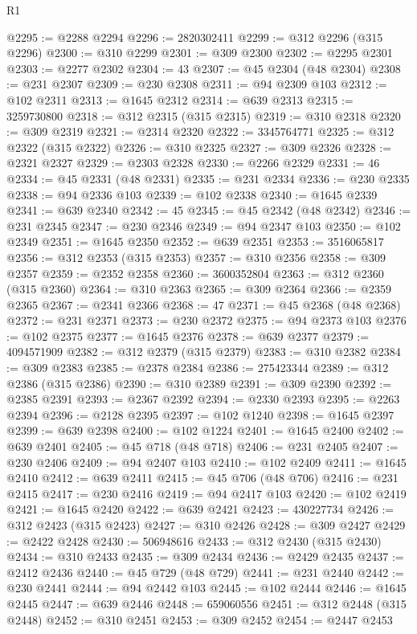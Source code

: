 \begin{lexlean}{R1}
\begin{coremodule}
@2295 := @2288 @2294
@2296 := 2820302411
@2299 := @312 @2296 (@315 @2296)
@2300 := @310 @2299
@2301 := @309 @2300
@2302 := @2295 @2301
@2303 := @2277 @2302
@2304 := 43
@2307 := @45 @2304 (@48 @2304)
@2308 := @231 @2307
@2309 := @230 @2308
@2311 := @94 @2309 @103
@2312 := @102 @2311
@2313 := @1645 @2312
@2314 := @639 @2313
@2315 := 3259730800
@2318 := @312 @2315 (@315 @2315)
@2319 := @310 @2318
@2320 := @309 @2319
@2321 := @2314 @2320
@2322 := 3345764771
@2325 := @312 @2322 (@315 @2322)
@2326 := @310 @2325
@2327 := @309 @2326
@2328 := @2321 @2327
@2329 := @2303 @2328
@2330 := @2266 @2329
@2331 := 46
@2334 := @45 @2331 (@48 @2331)
@2335 := @231 @2334
@2336 := @230 @2335
@2338 := @94 @2336 @103
@2339 := @102 @2338
@2340 := @1645 @2339
@2341 := @639 @2340
@2342 := 45
@2345 := @45 @2342 (@48 @2342)
@2346 := @231 @2345
@2347 := @230 @2346
@2349 := @94 @2347 @103
@2350 := @102 @2349
@2351 := @1645 @2350
@2352 := @639 @2351
@2353 := 3516065817
@2356 := @312 @2353 (@315 @2353)
@2357 := @310 @2356
@2358 := @309 @2357
@2359 := @2352 @2358
@2360 := 3600352804
@2363 := @312 @2360 (@315 @2360)
@2364 := @310 @2363
@2365 := @309 @2364
@2366 := @2359 @2365
@2367 := @2341 @2366
@2368 := 47
@2371 := @45 @2368 (@48 @2368)
@2372 := @231 @2371
@2373 := @230 @2372
@2375 := @94 @2373 @103
@2376 := @102 @2375
@2377 := @1645 @2376
@2378 := @639 @2377
@2379 := 4094571909
@2382 := @312 @2379 (@315 @2379)
@2383 := @310 @2382
@2384 := @309 @2383
@2385 := @2378 @2384
@2386 := 275423344
@2389 := @312 @2386 (@315 @2386)
@2390 := @310 @2389
@2391 := @309 @2390
@2392 := @2385 @2391
@2393 := @2367 @2392
@2394 := @2330 @2393
@2395 := @2263 @2394
@2396 := @2128 @2395
@2397 := @102 @1240
@2398 := @1645 @2397
@2399 := @639 @2398
@2400 := @102 @1224
@2401 := @1645 @2400
@2402 := @639 @2401
@2405 := @45 @718 (@48 @718)
@2406 := @231 @2405
@2407 := @230 @2406
@2409 := @94 @2407 @103
@2410 := @102 @2409
@2411 := @1645 @2410
@2412 := @639 @2411
@2415 := @45 @706 (@48 @706)
@2416 := @231 @2415
@2417 := @230 @2416
@2419 := @94 @2417 @103
@2420 := @102 @2419
@2421 := @1645 @2420
@2422 := @639 @2421
@2423 := 430227734
@2426 := @312 @2423 (@315 @2423)
@2427 := @310 @2426
@2428 := @309 @2427
@2429 := @2422 @2428
@2430 := 506948616
@2433 := @312 @2430 (@315 @2430)
@2434 := @310 @2433
@2435 := @309 @2434
@2436 := @2429 @2435
@2437 := @2412 @2436
@2440 := @45 @729 (@48 @729)
@2441 := @231 @2440
@2442 := @230 @2441
@2444 := @94 @2442 @103
@2445 := @102 @2444
@2446 := @1645 @2445
@2447 := @639 @2446
@2448 := 659060556
@2451 := @312 @2448 (@315 @2448)
@2452 := @310 @2451
@2453 := @309 @2452
@2454 := @2447 @2453

\end{coremodule}
\end{lexlean}
